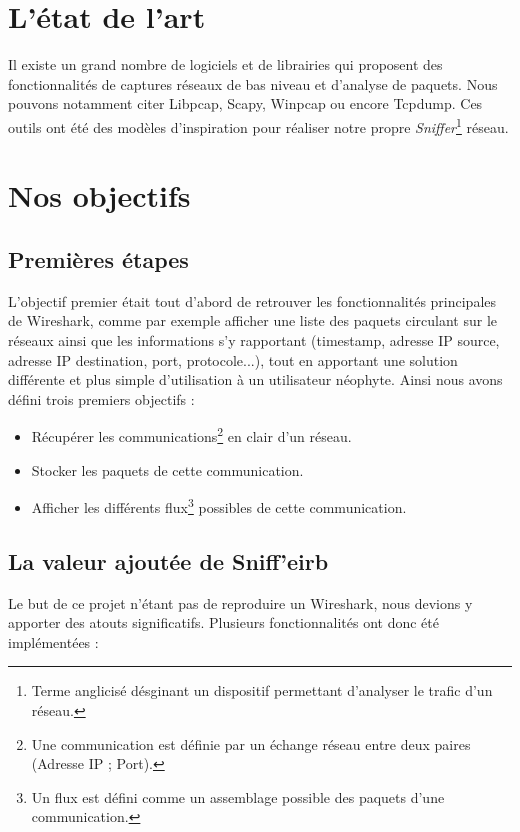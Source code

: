 \section{L'état de l'art}
Il existe un grand nombre de logiciels et de librairies qui proposent des fonctionnalités de captures réseaux de bas niveau et d'analyse de paquets.
Nous pouvons notamment citer Libpcap, Scapy, Winpcap ou encore Tcpdump. Ces outils ont été des modèles d'inspiration pour réaliser notre propre \textit{Sniffer}\footnote{Terme anglicisé désginant un dispositif permettant d'analyser le trafic d'un réseau.} réseau.\\

\section{Nos objectifs}
\subsection{Premières étapes}
L'objectif premier était tout d'abord de retrouver les fonctionnalités principales de Wireshark, comme par exemple afficher une liste des paquets circulant sur le réseaux ainsi que les informations s'y rapportant (timestamp, adresse IP source, adresse IP destination, port, protocole...), tout en apportant une solution différente et plus simple d'utilisation à un utilisateur néophyte. Ainsi nous avons défini trois premiers objectifs :
\begin{itemize}
\item Récupérer les communications\footnote{Une communication est définie par un échange réseau entre deux paires (Adresse IP ; Port).} en clair d'un réseau.
\item Stocker les paquets de cette communication.
\item Afficher les différents flux\footnote{Un flux est défini comme un assemblage possible des paquets d'une communication.} possibles de cette communication.\\
\end{itemize}

\subsection{La valeur ajoutée de Sniff'eirb}

Le but de ce projet n'étant pas de reproduire un Wireshark, nous devions y apporter des atouts significatifs. Plusieurs fonctionnalités ont donc été implémentées :

